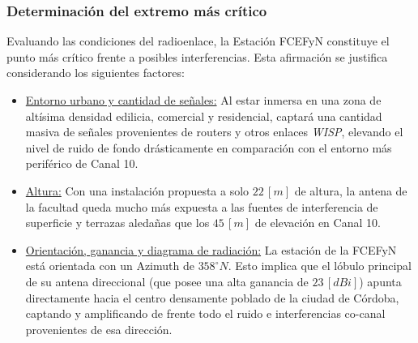 \subsubsection{Determinación del extremo más crítico}
\label{sec_2.16.1}
Evaluando las condiciones del radioenlace, la Estación FCEFyN constituye el punto más crítico frente a posibles interferencias. Esta afirmación se justifica considerando los siguientes factores:
\begin{itemize}
    \item \underline{Entorno urbano y cantidad de señales:} Al estar inmersa en una zona de altísima densidad edilicia, comercial y residencial, captará una cantidad masiva de señales provenientes de routers y otros enlaces \textit{WISP}, elevando el nivel de ruido de fondo drásticamente en comparación con el entorno más periférico de Canal 10.
    \item \underline{Altura:} Con una instalación propuesta a solo $22 \, [m]$ de altura, la antena de la facultad queda mucho más expuesta a las fuentes de interferencia de superficie y terrazas aledañas que los $45 \, [m]$ de elevación en Canal 10.
    \item \underline{Orientación, ganancia y diagrama de radiación:} La estación de la FCEFyN está orientada con un Azimuth de $358^{\circ}N$. Esto implica que el lóbulo principal de su antena direccional (que posee una alta ganancia de $23 \, [dBi]$) apunta directamente hacia el centro densamente poblado de la ciudad de Córdoba, captando y amplificando de frente todo el ruido e interferencias co-canal provenientes de esa dirección.
\end{itemize}



